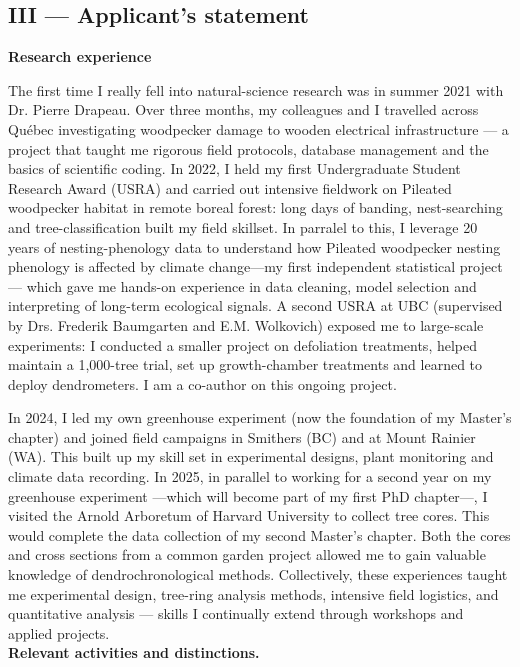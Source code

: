 \documentclass[12pt]{article}
\begin{document}
\subsection*{III --- Applicant’s statement}

\textbf{Research experience}  

The first time I really fell into natural-science research was in summer 2021 with Dr. Pierre Drapeau. Over three months, my colleagues and I travelled across Québec investigating woodpecker damage to wooden electrical infrastructure — a project that taught me rigorous field protocols, database management and the basics of scientific coding. In 2022, I held my first Undergraduate Student Research Award (USRA) and carried out intensive fieldwork on Pileated woodpecker habitat in remote boreal forest: long days of banding, nest-searching and tree-classification built my field skillset. In parralel to this, I leverage 20 years of nesting-phenology data to understand how Pileated woodpecker nesting phenology is affected by climate change---my first independent statistical project--- which gave me hands-on experience in data cleaning, model selection and interpreting of long-term ecological signals. A second USRA at UBC (supervised by Drs. Frederik Baumgarten and E.M. Wolkovich) exposed me to large-scale experiments: I conducted a smaller project on defoliation treatments, helped maintain a 1,000-tree trial, set up growth-chamber treatments and learned to deploy dendrometers. I am a co-author on this ongoing project.

In 2024, I led my own greenhouse experiment (now the foundation of my Master’s chapter) and joined field campaigns in Smithers (BC) and at Mount Rainier (WA). This built up my skill set in experimental designs, plant monitoring and climate data recording. In 2025, in parallel to working for a second year on my greenhouse experiment ---which will become part of my first PhD chapter---, I visited the Arnold Arboretum of Harvard University to collect tree cores. This would complete the data collection of my second Master's chapter. Both the cores and cross sections from a common garden project allowed me to gain valuable knowledge of dendrochronological methods. Collectively, these experiences taught me experimental design, tree-ring analysis methods, intensive field logistics, and quantitative analysis — skills I continually extend through workshops and applied projects. \\

\textbf{Relevant activities and distinctions.}  
\end{document}
